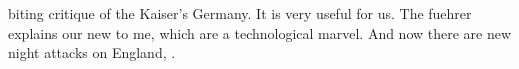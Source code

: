 biting critique of the Kaiser's Germany. It is very useful for us. The fuehrer explains our new  to me, which are a technological marvel. And now there are new night attacks on England, . \missing